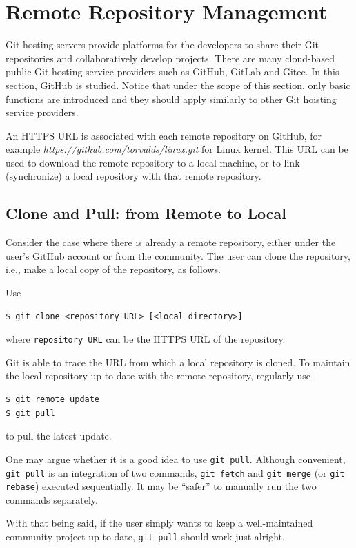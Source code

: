 \section{Remote Repository Management} \label{ch:sma:sec:rrm}

Git hosting servers provide platforms for the developers to share their Git repositories and collaboratively develop projects. There are many cloud-based public Git hosting service providers such as GitHub, GitLab and Gitee. In this section, GitHub is studied. Notice that under the scope of this section, only basic functions are introduced and they should apply similarly to other Git hoisting service providers.   

An HTTPS URL is associated with each remote repository on GitHub, for example \textit{https://github.com/torvalds/linux.git} for Linux kernel. This URL can be used to download the remote repository to a local machine, or to link (synchronize) a local repository with that remote repository.

\subsection{Clone and Pull: from Remote to Local}

Consider the case where there is already a remote repository, either under the user's GitHub account or from the community. The user can clone the repository, i.e., make a local copy of the repository, as follows.

Use
\begin{lstlisting}
$ git clone <repository URL> [<local directory>]
\end{lstlisting}
where \verb|repository URL| can be the HTTPS URL of the repository. 

Git is able to trace the URL from which a local repository is cloned. To maintain the local repository up-to-date with the remote repository, regularly use
\begin{lstlisting}
$ git remote update
$ git pull
\end{lstlisting}
to pull the latest update.

\begin{shortbox}

One may argue whether it is a good idea to use \verb|git pull|. Although convenient, \verb|git pull| is an integration of two commands, \verb|git fetch| and \verb|git merge| (or \verb|git rebase|) executed sequentially. It may be ``safer'' to manually run the two commands separately.

With that being said, if the user simply wants to keep a well-maintained community project up to date, \verb|git pull| should work just alright.
\end{shortbox}

